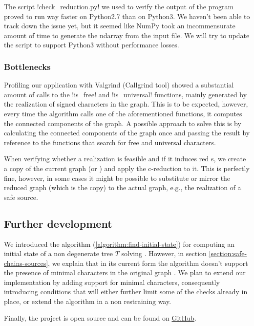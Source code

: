 The script !check_reduction.py! we used to verify the output of the \cc{} program proved to run way faster on Python2.7 than on Python3.
We haven't been able to track down the issue yet, but it seemed like NumPy took an incommensurate amount of time to generate the ndarray from the input file.
We will try to update the script to support Python3 without performance losses.

\subsubsection{Bottlenecks}\label{section:bottlenecks}

Profiling our application with Valgrind (Callgrind tool) showed a substantial amount of calls to the !is_free! and !is_universal! functions, mainly generated by the realization of signed characters in the graph.
This is to be expected, however, every time the algorithm calls one of the aforementioned functions, it computes the connected components of the graph.
A possible approach to solve this is by calculating the connected components of the graph once and passing the result by reference to the functions that search for free and universal characters.

When verifying whether a realization is feasible and if it induces red \sg{}s, we create a copy of the current graph \grb{} (or \gm{}) and apply the c-reduction to it.
This is perfectly fine, however, in some cases it might be possible to substitute or mirror the reduced graph (which is the copy) to the actual graph, e.g., the realization of a safe source.

\subsection{Further development}\label{section:further-dev}

We introduced the algorithm (\ref{algorithm:find-initial-state}) for computing an initial state of a non degenerate tree $T$ solving \grb{}.
However, in section \ref{section:safe-chains-sources}, we explain that in its current form the algorithm doesn't support the presence of minimal characters in the original graph \grb{}.
We plan to extend our implementation by adding support for minimal characters, consequently introducing conditions that will either further limit some of the checks already in place, or extend the algorithm in a non restraining way.

Finally, the project is open source and can be found on \href{https://github.com/dcasella/persistent-phylogeny}{GitHub}.

